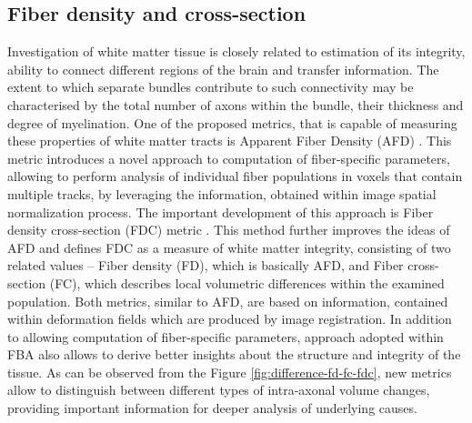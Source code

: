 \documentclass[thesis.tex]{subfiles}
\begin{document}
\subsection{Fiber density and cross-section}
Investigation of white matter tissue is closely related to estimation of its integrity, ability to connect different regions of the brain and transfer information. The extent to which separate bundles contribute to such connectivity may be characterised by the total number of axons within the bundle, their thickness and degree of myelination. One of the proposed metrics, that is capable of measuring these properties of white matter tracts is Apparent Fiber Density (AFD) \cite{afd2012Raffelt}. This metric introduces a novel approach to computation of fiber-specific parameters, allowing to perform analysis of individual fiber populations in voxels that contain multiple tracks, by leveraging the information, obtained within image spatial normalization process. The important development of this approach is Fiber density cross-section (FDC) metric \cite{fdcAndFBA2017Raffelt}. This method further improves the ideas of AFD and defines FDC as a measure of white matter integrity, consisting of two related values -- Fiber density (FD), which is basically AFD, and Fiber cross-section (FC), which describes local volumetric differences within the examined population. Both metrics, similar to AFD, are based on information, contained within deformation fields which are produced by image registration. In addition to allowing computation of fiber-specific parameters, approach adopted within FBA also allows to derive better insights about the structure and integrity of the tissue. As can be observed from the Figure \ref{fig:difference-fd-fc-fdc}, new metrics allow to distinguish between different types of intra-axonal volume changes, providing important information for deeper analysis of underlying causes.
\end{document}
